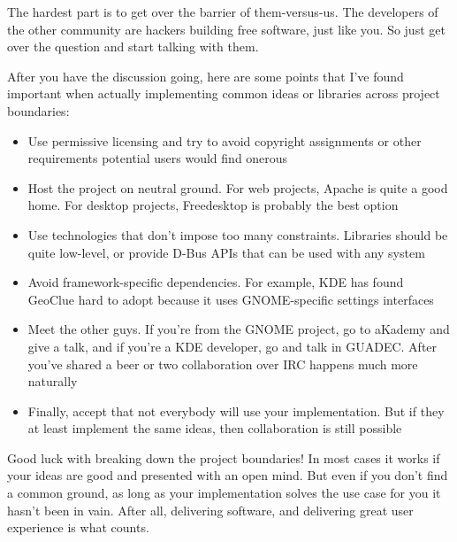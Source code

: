 The hardest part is to get over the barrier of them-versus-us. The developers of the other community are hackers building free software, just like you. So just get over the question and start talking with them.

After you have the discussion going, here are some points that I’ve found important when actually implementing common ideas or libraries across project boundaries:

\begin{itemize}
\item Use permissive licensing and try to avoid copyright assignments or other requirements potential users would find onerous
\item Host the project on neutral ground. For web projects, Apache is quite a good home. For desktop projects, Freedesktop is probably the best option
\item Use technologies that don't impose too many constraints. Libraries should be quite low-level, or provide D-Bus APIs that can be used with any system
\item Avoid framework-specific dependencies. For example, KDE has found GeoClue hard to adopt because it uses GNOME-specific settings interfaces
\item Meet the other guys. If you're from the GNOME project, go to aKademy and give a talk, and if you're a KDE developer, go and talk in GUADEC. After you’ve shared a beer or two collaboration over IRC happens much more naturally
\item Finally, accept that not everybody will use your implementation. But if they at least implement the same ideas, then collaboration is still possible
\end{itemize}

Good luck with breaking down the project boundaries! In most cases it works if your ideas are good and presented with an open mind.  But even if you don’t find a common ground, as long as your implementation solves the use case for you it hasn't been in vain. After all, delivering software, and delivering great user experience is what counts.
